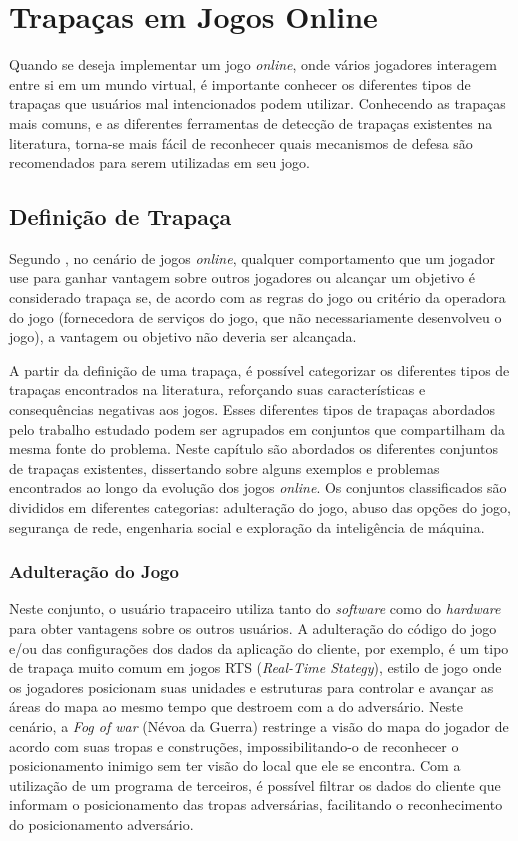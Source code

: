\chapter{Trapaças em Jogos Online}
\label{cap:cheating}

Quando se deseja implementar um jogo \textit{online}, onde vários jogadores interagem entre si em um mundo virtual, é importante conhecer os diferentes tipos de trapaças que usuários mal intencionados podem utilizar. Conhecendo as trapaças mais comuns, e as diferentes ferramentas de detecção de trapaças existentes na literatura, torna-se mais fácil de reconhecer quais mecanismos de defesa são recomendados para serem utilizadas em seu jogo.

\section{Definição de Trapaça}

Segundo \cite{yan}, no cenário de jogos \textit{online}, qualquer comportamento que um jogador use para ganhar vantagem sobre outros jogadores ou alcançar um objetivo é considerado trapaça se, de acordo com as regras do jogo ou critério da operadora do jogo (fornecedora de serviços do jogo, que não necessariamente desenvolveu o jogo), a vantagem ou objetivo não deveria ser alcançada. 

A partir da definição de uma trapaça, é possível categorizar os diferentes tipos de trapaças encontrados na literatura, reforçando suas características e consequências negativas aos jogos. Esses diferentes tipos de trapaças abordados pelo trabalho estudado podem ser agrupados em conjuntos que compartilham da mesma fonte do problema. Neste capítulo são abordados os diferentes conjuntos de trapaças existentes, dissertando sobre alguns exemplos e problemas encontrados ao longo da evolução dos jogos \textit{online}. Os conjuntos classificados são divididos em diferentes categorias: adulteração do jogo, abuso das opções do jogo, segurança de rede, engenharia social e exploração da inteligência de máquina.

\subsection{Adulteração do Jogo}
\label{adulteracao}
Neste conjunto, o usuário trapaceiro utiliza tanto do \textit{software} como do \textit{hardware} para obter vantagens sobre os outros usuários. A adulteração do código do jogo e/ou das configurações dos dados da aplicação do cliente, por exemplo, é um tipo de trapaça muito comum em jogos RTS (\textit{Real-Time Stategy}), estilo de jogo onde os jogadores posicionam suas unidades e estruturas para controlar e avançar as áreas do mapa ao mesmo tempo que destroem com a do adversário. Neste cenário, a \textit{Fog of war} (Névoa da Guerra) restringe a visão  do mapa do jogador de acordo com suas tropas e construções, impossibilitando-o de reconhecer o posicionamento inimigo sem ter visão do local que ele se encontra. Com a utilização de um programa de terceiros, é possível filtrar os dados do cliente que informam o posicionamento das tropas adversárias, facilitando o reconhecimento do posicionamento adversário. 

